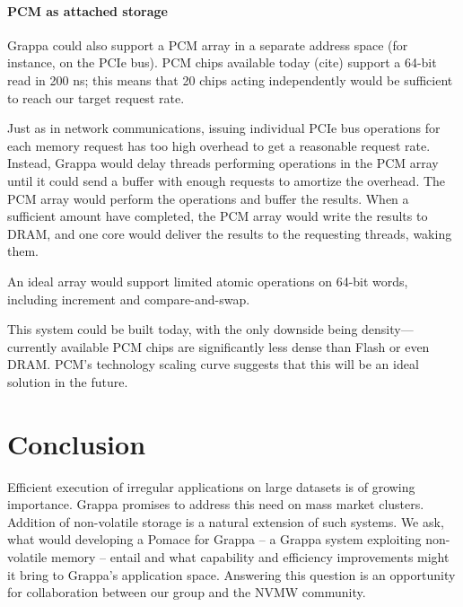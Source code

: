 \paragraph{PCM as attached storage}

Grappa could also support a PCM array in a separate address space (for
instance, on the PCIe bus). PCM chips available today (cite) support a
64-bit read in 200 ns; this means that 20 chips acting independently
would be sufficient to reach our target request rate.

Just as in network communications, issuing individual PCIe bus
operations for each memory request has too high overhead to get a
reasonable request rate.  Instead, Grappa would delay threads
performing operations in the PCM array until it could send a buffer
with enough requests to amortize the overhead. The PCM array would
perform the operations and buffer the results. When a sufficient
amount have completed, the PCM array would write the results to DRAM,
and one core would deliver the results to the requesting threads,
waking them.

An ideal array would support limited atomic operations on 64-bit
words, including increment and compare-and-swap.

This system could be built today, with the only downside being
density---currently available PCM chips are significantly less dense
than Flash or even DRAM. PCM's technology scaling curve suggests that
this will be an ideal solution in the future.

\section{Conclusion}
Efficient execution of irregular applications on large datasets is of
growing importance.  Grappa promises to address this need on mass
market clusters.  Addition of non-volatile storage is a natural
extension of such systems.  We ask, what would developing a Pomace for
Grappa -- a Grappa system exploiting non-volatile memory -- entail and
what capability and efficiency improvements might it bring to Grappa's
application space.  Answering this question is an opportunity for
collaboration between our group and the NVMW community.











